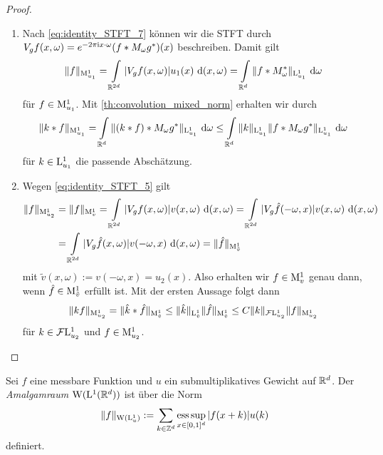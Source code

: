 \begin{proof}
	\begin{enumerate}[label =\textbf{(\roman*)}]
		\item Nach \eqref{eq:identity_STFT_7} können wir die STFT durch
		$ V_g f(x,\omega) = e^{-2\pi \textrm{i} x \cdot \omega} (f \ast M_\omega g^\ast)(x) $ beschreiben.
		Damit gilt
		\begin{align*}
		\| f \|_{\mathrm{M}^1_{u_1}} = 
		\int \limits_{\mathbb{R}^{2d}} |V_g f(x,\omega) | u_1(x) \text{ d} (x,\omega)
		=
		\int \limits_{\mathbb{R}^d} \| f \ast M_\omega^\ast\|_{\mathrm{L}^1_{u_1}} \text{ d} \omega
		\end{align*}
		für $ f \in \mathrm{M}^1_{u_1} $. Mit \ref{th:convolution_mixed_norm} erhalten wir durch
		\begin{align*}
		\| k \ast f \|_{\mathrm{M}^1_{u_1}} 
		=
		\int \limits_{\mathbb{R}^d}
		\| (k \ast f) \ast M_\omega g^\ast \|_{\mathrm{L}^1_{u_1}} \text{ d} \omega
		\leq
		\int \limits_{\mathbb{R}^d}\| k \|_{\mathrm{L}^1_{u_1}}
		\| f \ast M_\omega g^\ast \|_{\mathrm{L}^1_{u_1}} \text{ d} \omega
		\end{align*}
		für $ k \in \mathrm{L}^1_{u_1} $ die passende Abschätzung.
		
		\item
		Wegen \eqref{eq:identity_STFT_5} gilt
		\begin{align*}
		\| f \|_{\mathrm{M}_{u_2}^1}
		&=
		\| f \|_{\mathrm{M}_v^1}
		=
		\int \limits_{\mathbb{R}^{2d}}
		| V_g f (x,\omega) | v(x,\omega ) \text{ d} (x,\omega)
		=
		\int \limits_{\mathbb{R}^{2d}}
		| V_g \hat{ f} (- \omega,x) | v(x,\omega ) \text{ d} (x,\omega)\\
		&=
		\int \limits_{\mathbb{R}^{2d}}
		| V_g \hat{f } (x,\omega) | v(- \omega,x ) \text{ d} (x,\omega)
		=
		\| \hat{f } \|_{\mathrm{M}^1_{\tilde{ v}}}
		\end{align*}
		mit $ \tilde{ v}(x,\omega) := v(-\omega,x) = u_2(x) $.
		Also erhalten wir $ f \in \mathrm{M}^1_v $ genau dann, wenn $ \hat{ f} \in \mathrm{M}_{\tilde{ v}}^1 $ erfüllt ist.
		Mit der ersten Aussage folgt dann 
		\begin{align*}
		\| kf \|_{\mathrm{M}^1_{u_2}} = 
		\| \hat{k} \ast \hat{f} \|_{\mathrm{M}^1_{\tilde{v}}}
		\leq 
		\| \hat{k} \|_{\mathrm{L}^1_{\tilde{v}}}
		\| \hat{f} \|_{\mathrm{M}^1_{\tilde{v}}}
		\leq 
		C \| k \|_{\mathcal{F}\mathrm{L}^1_{u_2}} \| f \|_{\mathrm{M}^1_{u_2}}
		\end{align*}
		für $ k \in \mathcal{F} \mathrm{L}^1_{u_2} $ und $ f \in \mathrm{M}^1_{u_2} $.
	\end{enumerate}
\end{proof}

\begin{df}
	Sei $ f $ eine messbare Funktion und $ u $ ein submultiplikatives Gewicht auf $ \mathbb{R}^d $. 
	Der \textit{Amalgamraum} $ \mathrm{W}(\mathrm{L}^1(\mathbb{R}^d)) $ ist über die Norm
	\begin{equation}
	\| f \|_{\mathrm{W}(\mathrm{L}^1_u)}
	:=
	\sum \limits_{k \in \mathbb{Z}^d}
	\operatorname*{ess\,sup} \limits_{x \in [0,1]^d} |f(x+k)| u(k)
	\end{equation}
	definiert.
\end{df}

